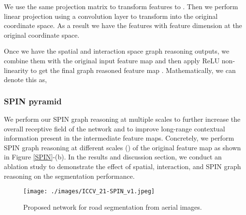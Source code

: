 \documentclass[letterpaper, 10 pt, conference]{ieeeconf}
\begin{document}
 We use the same projection matrix  to transform features to . Then we perform linear projection  using a  convolution layer to transform  into the original coordinate space. As a result we have the features  with feature dimension  at the original coordinate space. 
 
 Once we have the spatial and interaction space graph reasoning outputs, we combine them with the original input feature map and then apply ReLU non-linearity to get the final graph reasoned feature map . Mathematically, we can denote this as,
 





\subsubsection{SPIN pyramid}We perform our SPIN graph reasoning at multiple scales to further increase the overall receptive field of the network and to improve long-range contextual information present in the intermediate feature maps. Concretely, we perform SPIN graph reasoning at different scales () of the original feature map as shown in Figure \ref{SPIN}-(b). In the results and discussion section, we conduct an ablation study to demonstrate the effect of spatial, interaction, and SPIN graph reasoning on the segmentation performance.

\begin{figure}[t!]
	\centering
	\texttt{[image: ./images/ICCV\_21-SPIN\_v1.jpeg]}
    \vskip-10pt	
    \caption{Proposed network for road segmentation from aerial images. 
}
	\label{Proposed_network}
	\vspace{-5mm}
\end{figure}
\end{document}
